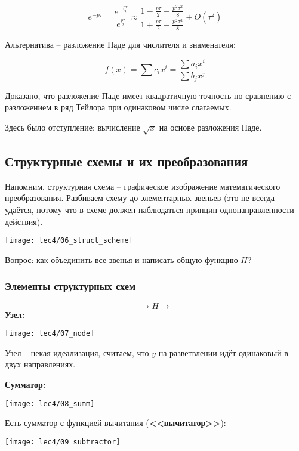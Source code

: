 \documentclass[main.tex]{subfiles}
\begin{document}
\begin{enumerate}[noitemsep]
    $$ e^{-p\tau} = \frac{e^{-\frac{p\tau}{2}}}{e^{\frac{p\tau}{2}}} \approx \frac{1 - \frac{p\tau}{2} + \frac{p^2\tau^2}{8}}{1 + \frac{p\tau}{2} + \frac{p^2\tau^2}{8}} + O(\tau^2) $$ %

    Альтернатива -- разложение Паде для числителя и знаменателя:

    $$ f(x) = \sum c_ix^i = \frac{\sum a_i x^i}{\sum b_j x^j} $$

    Доказано, что разложение Паде имеет квадратичную точность по сравнению с разложением в ряд Тейлора при одинаковом числе слагаемых.\\

    \begin{leftbar}
        Здесь было отступление: вычисление $ \sqrt x $ на основе разложения Паде.
    \end{leftbar}
\end{enumerate}

\subsection{Структурные схемы и их преобразования}

Напомним, структурная схема -- графическое изображение математического преобразования.
Разбиваем схему до элементарных звеньев (это не всегда удаётся, потому что в схеме должен наблюдаться принцип однонаправленности действия).

\texttt{[image: lec4/06\_struct\_scheme]}

Вопрос: как объединить все звенья и написать общую функцию $ H $?

\subsubsection{Элементы структурных схем}

$$ \rightarrow \boxed{H} \rightarrow $$
\textbf{Узел:}

\texttt{[image: lec4/07\_node]}

Узел -- некая идеализация, считаем, что $ y $ на разветвлении идёт одинаковый в двух направлениях.

\textbf{Сумматор:}

\texttt{[image: lec4/08\_summ]}

Есть сумматор с функцией вычитания (\textbf{<<вычитатор>>}):

\texttt{[image: lec4/09\_subtractor]}
\end{document}
